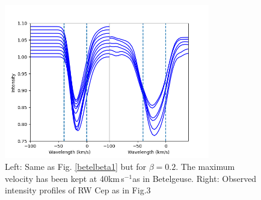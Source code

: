 \documentclass{/Users/art2/TeX/aanda/aa}
\def\kms {km\,s$^{-1}$}
\begin{document}
\begin{figure}
   \includegraphics[width=0.8\textwidth]{Fig6_art74.png}
   \caption{Left: Same as Fig. \ref{betelbeta1} but for $\beta=0.2$. The maximum velocity has been kept at 40\kms as in Betelgeuse. Right: Observed intensity profiles of RW Cep  as in Fig.3}
   \label{RWbeta}
   \end{figure}

\end{document}
